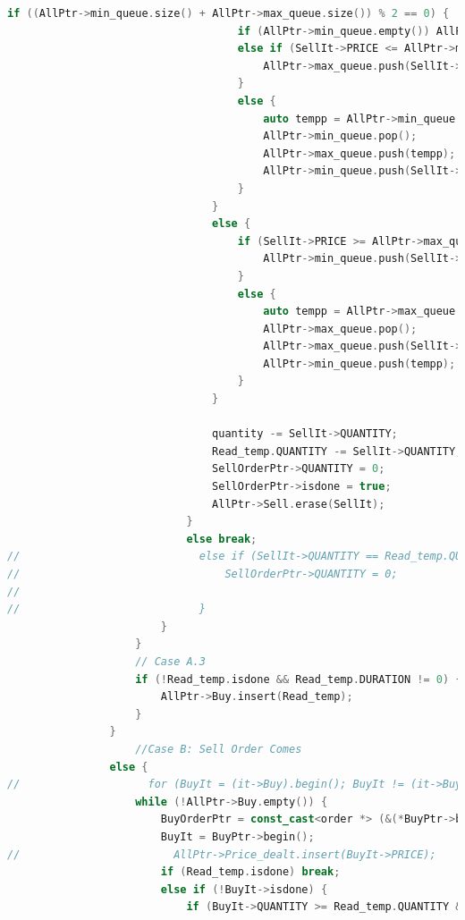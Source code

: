 \documentclass{article}
\begin{document}
\begin{lstlisting}[language=C++]
                                if ((AllPtr->min_queue.size() + AllPtr->max_queue.size()) % 2 == 0) {
                                    if (AllPtr->min_queue.empty()) AllPtr->max_queue.push(SellIt->PRICE);
                                    else if (SellIt->PRICE <= AllPtr->min_queue.top()) {
                                        AllPtr->max_queue.push(SellIt->PRICE);
                                    }
                                    else {
                                        auto tempp = AllPtr->min_queue.top();
                                        AllPtr->min_queue.pop();
                                        AllPtr->max_queue.push(tempp);
                                        AllPtr->min_queue.push(SellIt->PRICE);
                                    }
                                }
                                else {
                                    if (SellIt->PRICE >= AllPtr->max_queue.top()) {
                                        AllPtr->min_queue.push(SellIt->PRICE);
                                    }
                                    else {
                                        auto tempp = AllPtr->max_queue.top();
                                        AllPtr->max_queue.pop();
                                        AllPtr->max_queue.push(SellIt->PRICE);
                                        AllPtr->min_queue.push(tempp);
                                    }
                                }

                                quantity -= SellIt->QUANTITY;
                                Read_temp.QUANTITY -= SellIt->QUANTITY;
                                SellOrderPtr->QUANTITY = 0;
                                SellOrderPtr->isdone = true;
                                AllPtr->Sell.erase(SellIt);
                            }
                            else break;
//                            else if (SellIt->QUANTITY == Read_temp.QUANTITY && Read_temp.PRICE > SellIt->PRICE) {
//                                SellOrderPtr->QUANTITY = 0;
//
//                            }
                        }
                    }
                    // Case A.3
                    if (!Read_temp.isdone && Read_temp.DURATION != 0) {
                        AllPtr->Buy.insert(Read_temp);
                    }
                }
                    //Case B: Sell Order Comes
                else {
//                    for (BuyIt = (it->Buy).begin(); BuyIt != (it->Buy).end(); BuyIt++) {
                    while (!AllPtr->Buy.empty()) {
                        BuyOrderPtr = const_cast<order *> (&(*BuyPtr->begin()));
                        BuyIt = BuyPtr->begin();
//                        AllPtr->Price_dealt.insert(BuyIt->PRICE);
                        if (Read_temp.isdone) break;
                        else if (!BuyIt->isdone) {
                            if (BuyIt->QUANTITY >= Read_temp.QUANTITY && Read_temp.PRICE <= BuyIt->PRICE) {


\end{lstlisting}
\end{document}

